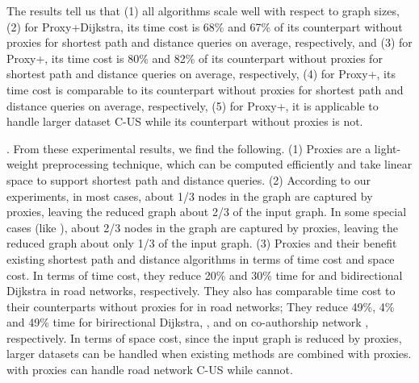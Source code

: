 The results tell us that (1) all algorithms scale well with respect to graph sizes, (2) for Proxy+Dijkstra, its time cost is 68\% and 67\% of  its counterpart without proxies for shortest path and distance queries on average, respectively, and (3) for Proxy+\arcflag, its time cost is 80\% and 82\% of its counterpart without proxies for shortest  path and distance queries on average, respectively, (4) for Proxy+\tnr, its time cost is comparable to its counterpart without proxies for shortest path and distance queries on average, respectively, (5) for Proxy+\tnr, it is applicable to handle larger dataset C-US while its counterpart \tnr without proxies is not. %






\vspace{-0.5ex}
.
From these experimental results, we find the following. (1) Proxies are a light-weight preprocessing technique, which can be computed efficiently and take linear space to support shortest path and distance queries.  (2) According to our experiments, in most cases, about 1/3 nodes in the graph are captured by proxies, leaving the reduced graph about 2/3 of the input graph. In some special cases (like \dblpone), about 2/3 nodes in the graph are captured by proxies, leaving the reduced graph about only 1/3 of the input graph. (3) Proxies and their \dras benefit existing shortest path and distance algorithms in terms of time cost and space cost. In terms of time cost, \eg they reduce 20\% and 30\% time for \arcflag and bidirectional Dijkstra in road networks, respectively. They also has comparable time cost to their counterparts without proxies for \tnr in road networks; They reduce 49\%, 4\% and 49\% time for birirectional Dijkstra, \arcflag, and \tnr on co-authorship network \dblpone, respectively. In terms of space cost, since the input graph is reduced by proxies, larger datasets can be handled when existing methods are combined with proxies. \eg \tnr with proxies can handle road network C-US while \tnr cannot.

